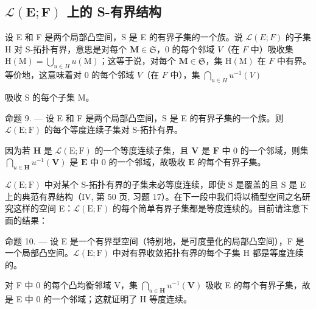 \subsection{\texorpdfstring{\(\mathcal{L}(\mathbf{E};\mathbf{F})\) 上的 S-有界结构}{\textbackslash mathcal\{L\}(\textbackslash mathbf\{E\};\textbackslash mathbf\{F\}) 上的 S-有界结构}}

设 E 和 F 是两个局部凸空间，S 是 E 的有界子集的一个族。说 \(\mathcal{L}(E; F)\) 的子集 H 对 S-拓扑有界，意思是对每个 \(\mathbf{M} \in \mathfrak{S}\)，0 的每个邻域 \(V\)（在 \(F\) 中）吸收集 \(\mathrm{H(M)} = \bigcup_{u \in H} u(\mathrm{M})\)；这等于说，对每个 \(\mathbf{M} \in \mathfrak{S}\)，集 \(\mathrm{H(M)}\) 在 \(F\) 中有界。等价地，这意味着对 0 的每个邻域 \(V\)（在 \(F\) 中），集 \(\bigcap_{u \in H} u^{-1}(V)\)

吸收 S 的每个子集 M。

命题 9. --- 设 E 和 F 是两个局部凸空间，S 是 E 的有界子集的一个族。则 \(\mathcal{L}(\mathrm{E};\mathrm{F})\) 的每个等度连续子集对 S-拓扑有界。

因为若 \(\mathbf{H}\) 是 \(\mathcal{L}(\mathrm{E};\mathrm{F})\) 的一个等度连续子集，且 \(\mathbf{V}\) 是 \(\mathbf{F}\) 中 0 的一个邻域，则集 \(\bigcap_{u\in \mathbf{H}}u^{-1}(\mathbf{V})\) 是 \(\mathbf{E}\) 中 0 的一个邻域，故吸收 \(\mathbf{E}\) 的每个有界子集。

\(\mathcal{L}(\mathrm{E};\mathrm{F})\) 中对某个 S-拓扑有界的子集未必等度连续，即使 S 是覆盖的且 S 是 E 上的典范有界结构（IV, 第 50 页, 习题 17）。在下一段中我们将以桶型空间之名研究这样的空间 E：\(\mathcal{L}(\mathrm{E};\mathrm{F})\) 的每个简单有界子集都是等度连续的。目前请注意下面的结果：

命题 10. --- 设 E 是一个有界型空间（特别地，是可度量化的局部凸空间），F 是一个局部凸空间。\(\mathcal{L}(\mathrm{E};\mathrm{F})\) 中对有界收敛拓扑有界的每个子集 H 都是等度连续的。

对 F 中 0 的每个凸均衡邻域 V，集 \(\bigcap_{u\in\mathbf{H}}u^{-1}(\mathbf{V})\) 吸收 E 的每个有界子集，故是 E 中 0 的一个邻域；这就证明了 H 等度连续。

